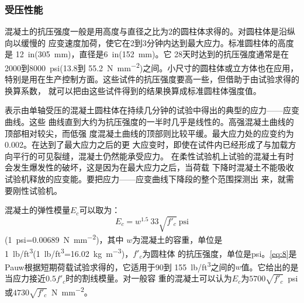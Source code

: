 \documentclass[12pt,a4paper]{book}
\begin{document}
\subsubsection{受压性能}

混凝土的抗压强度一般是用高度与直径之比为2的圆柱体求得的。对圆柱体是沿纵向以缓慢的
应变速度加荷，使它在2到3分钟内达到最大应力。标准圆柱体的高度是
\SI{12}{in}(\SI{305}{\milli\meter})，直径是\SI{6}{in}(\SI{152}{\milli\meter})。它
28天时达到的抗压强度通常是在2000到\SI{8000}{psi}(13.8到
\SI{55.2}{\newton\per\square\milli\meter})之间。小尺寸的圆柱体或立方体也在应用，
特别是用在生产控制方面。这些试件的抗压强度要高一些，但借助于由试验求得的换算系数，
就可以把由这些试件得到的结果换算成标准圆柱体强度值。

表示由单轴受压的混凝土圆柱体在持续几分钟的试验中得出的典型的应力——应变曲线。这些
曲线直到大约为抗压强度的一半时几乎是线性的。高强混凝土曲线的顶部相对较尖，而低强
度混凝土曲线的顶部则比较平缓。最大应力处的应变约为0.002。在达到了最大应力之后的更
大应变时，即使在试件内已经形成了与加载方向平行的可见裂缝，混凝土仍然能承受应力。
在柔性试验机上试验的混凝土有时会发生爆发性的破坏，这是因为在最大应力之后，当荷载
下降时混凝土不能吸收试验机释放的应变能。要把应力——应变曲线下降段的整个范围探测出
来，就需要刚性试验机。

混凝土的弹性模量$E_c$可以取为：
\begin{equation}
  \label{eq:8} E_c=w^{1.5}\:33\sqrt{f'_c}\ \mathrm{psi}
\end{equation} (\SI{1}{psi}=\SI{0.00689}{\newton\per\square\milli\meter})，其中
$w$为混凝土的容重，单位是
\SI{1}{lb/ft^3}(\SI{1}{lb/ft^3}=\SI{16.02}{\kg\per\cubic\meter})，$f'_c$为圆柱体
的抗压强度，单位是psi。\cref{eq:8}是Pauw根据短期荷载试验求得的，它适用于90到
\SI{155}{lb/ft^3}之间的$w$值。它给出的是当应力接近$0.5f'_c$时的割线模量。对一般容
重的混凝土可以认为$E_c$为$5700\sqrt{f'_c}$\ psi或$4730\sqrt{f'_c}$\
\si{\newton\per\square\milli\meter}。
\end{document}

